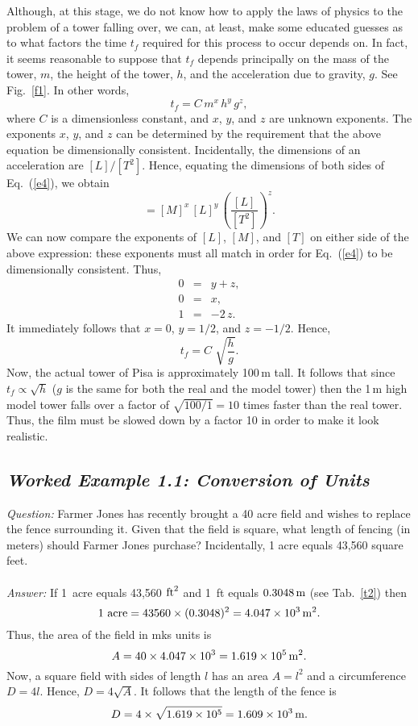 Although, at this stage, we do not know how to apply the laws of physics to the
problem of a tower falling over, we can, at least,  make some educated guesses as to what factors
the time $t_f$ required for this process to occur depends on. In fact, it
seems reasonable to suppose that $t_f$ depends principally on the mass of the tower, $m$, the
height of the tower, $h$, and the acceleration due to gravity, $g$. See Fig.~\ref{f1}. In other words,
\begin{equation}\label{e4}
t_f = C\,m^x\,h^y\,g^z,
\end{equation}
where $C$ is a dimensionless constant, and $x$, $y$, and $z$ are unknown exponents. The
exponents $x$, $y$, and $z$
can be determined by the requirement that the above equation be dimensionally
consistent. Incidentally, the dimensions of an acceleration are $[L]/[T^2]$. Hence,
equating the dimensions of both sides of Eq.~(\ref{e4}), we obtain
\begin{equation}
[T] = [M]^x\,[L]^y\,\left(\frac{[L]}{[T^2]}\right)^z.
\end{equation}
We can now compare the exponents of $[L]$, $[M]$, and $[T]$ on either side of the
above expression: these exponents must all match in order for Eq.~(\ref{e4}) to be dimensionally
consistent. Thus,
\begin{eqnarray}
0&=& y + z,\\
0 &=& x,\\
1 &=& -2\,z.
\end{eqnarray}
It immediately follows that $x=0$, $y=1/2$, and $z=-1/2$. Hence,
\begin{equation}
t_f = C\,\,\sqrt{\frac{h}{g}}.
\end{equation}
Now, the actual tower of Pisa is approximately 100\,m tall. It follows that since
$t_f\propto \sqrt{h}$ ($g$ is the same for both the real  and the model tower) then the
1\,m high model tower falls over a factor of $\sqrt{100/1}=10$ times faster than the real
tower. Thus, the film must be slowed down by a factor 10 in order to make it look realistic. 

\subsection*{\em Worked Example 1.1: Conversion of Units}
{\em Question:} Farmer Jones has recently brought a 40 acre field and wishes
to replace the fence surrounding it. Given that the field is square, what
 length of fencing (in meters) should Farmer Jones purchase? Incidentally,
1 acre equals  43,560 square feet.\\
~\\
{\em Answer:} If 1~acre equals 43,560 ${\rm ft}^2$ and 1~ft equals $0.3048\,{\rm m}$
(see Tab.~\ref{t2}) then
$$
1~{\rm acre} = 43560 \times (0.3048)^2 = 4.047\times 10^3\,{\rm m}^2.
$$
Thus, the area of the field in mks units is
$$
A = 40\times 4.047\times 10^3 = 1.619\times 10^5\,{\rm m}^2.
$$
Now, a square field with sides of length $l$ has an area $A=l^2$ and a circumference $D=4l$.
Hence, $D=4\sqrt{A}$. It follows that the length of the fence is
$$
D = 4\times \sqrt{1.619\times 10^5} = 1.609\times 10^3 \,{\rm m}.
$$

